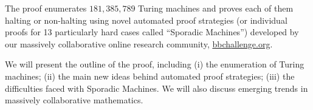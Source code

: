 \documentclass[11pt]{article}
\newcommand{\BBtheFifthTNF}{181{,}385{,}789}
\newcommand{\CoqBB}{Coq-BB5\xspace}
\theoremstyle{definition} %
\numberwithin{equation}{section}
\theoremstyle{definition} %
\begin{document}






The proof enumerates $\BBtheFifthTNF$ Turing machines and proves each of them halting or non-halting using novel automated proof strategies (or individual proofs for 13 particularly hard cases called ``Sporadic Machines'') developed by our massively collaborative online research community, \url{bbchallenge.org}. 

We will present the outline of the proof, including (i) the enumeration of Turing machines; (ii) the main new ideas behind automated proof strategies; (iii) the difficulties faced with Sporadic Machines. We will also discuss emerging trends in massively collaborative mathematics.

\vspace{-3em}

\end{document}
